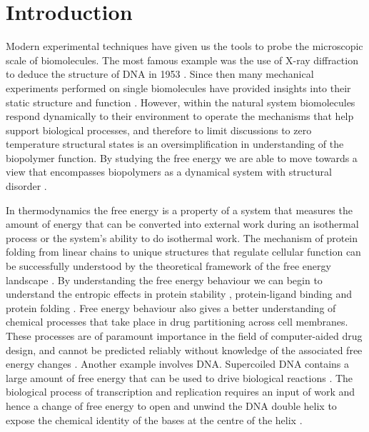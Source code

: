 \chapter{Introduction}

Modern experimental techniques have given us the tools to probe the microscopic scale of biomolecules. The most famous example was the use of X-ray diffraction to deduce the structure of DNA in 1953 \cite{Watson1953,Kittel1968}. Since then many mechanical experiments performed on single biomolecules have provided insights into their static structure and function \cite{Makarov2002,Cheung2004,Gaub2000}. However, within the natural system biomolecules respond dynamically to their environment to operate the mechanisms that help support biological processes, and therefore to limit discussions to zero temperature structural states is an oversimplification in understanding of the biopolymer function. By studying the free energy we are able to move towards a view that encompasses biopolymers as a dynamical system with structural disorder \cite{Beveridge1989,Kollman1993}. 

In thermodynamics the free energy is a property of a system that measures the amount of energy that can be converted into external work during an isothermal process or the system's ability to do isothermal work. The mechanism of protein folding from linear chains to unique structures that regulate cellular function can be successfully understood by the theoretical framework of the free energy landscape \cite{Berg2010,Cheung2004}. By understanding the free energy behaviour we can begin to understand the entropic effects in protein stability \cite{Karplus1987,Prevost1991,Lee2001,Trebbi2005}, protein-ligand binding \cite{Stone2001,Carlsson2005,Homans2005} and protein folding \cite{Daura2005,Bicout2000,Chavez2004}. Free energy behaviour also gives a better understanding of chemical processes that take place in drug partitioning across cell membranes. These processes are of paramount importance in the field of computer-aided drug design, and cannot be predicted reliably without knowledge of the associated free energy changes \cite{Chipot2006,Chipot2007}. Another example involves DNA. Supercoiled DNA contains a large amount of free energy that can be used to drive biological reactions \cite{Sinden1994}. The biological process of transcription and replication requires an input of work and hence a change of free energy to open and unwind the DNA double helix to expose the chemical identity of the bases at the centre of the helix \cite{Williams2010}.

